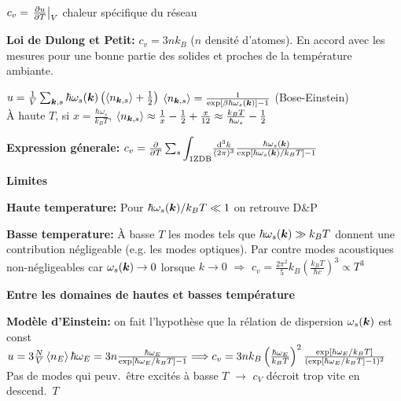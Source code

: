 \begin{squishlist}
    \item $c_v = \left.\D{T}{u}\right|_V$ chaleur spécifique du réseau
    \item \textbf{Loi de Dulong et Petit:} $c_v = 3n k_B$ ($n$ densité d'atomes). En accord avec les mesures pour une bonne partie des solides et proches de la température ambiante.
    \item $u = \frac{1}{V} \sum_{\vk,s} \hbar \omega_s(\vk) \left( \braket{n_{\vk,s}}+\frac{1}{2}\right)$ \quad $\braket{n_{\vk,s}} = \frac{1}{\exp[\beta \hbar \omega_s(\vk)]-1}$ (Bose-Einstein) \\
    À haute $T$, si $x = \frac{\hbar \omega_s}{k_B T}$, \quad $\braket{n_{\vk,s}} \approx \frac{1}{x} - \frac{1}{2} + \frac{x}{12} \approx \frac{k_BT}{\hbar \omega_s} - \frac{1}{2}$
    
    \item \textbf{Expression génerale:} $c_v = \D{T}{} \sum_s {\displaystyle\int_{\text{1ZDB}}} \frac{\ud^3 k}{(2\pi)^3} \frac{\hbar \omega_s(\vk)}{\exp[\hbar \omega_s(\vk)/k_B T]-1}$
    
    \squishline

    \textbf{Limites }
    \item \textbf{Haute temperature:} Pour $\hbar \omega_s(\vk)/k_BT \ll 1$ on retrouve D\&P
    \item \textbf{Basse temperature:} À basse $T$ les modes tels que $\hbar \omega_s(\vk) \gg k_BT$ donnent une contribution négligeable (e.g. les modes optiques). Par contre modes acoustiques non-négligeables car $\omega_s(\vk) \rightarrow 0$ lorsque $k \rightarrow 0$ $\Longrightarrow$ $c_v = \frac{2\pi^2}{5}k_B \left(\frac{k_B T}{\hbar c}\right)^3 \propto T^3$
    
    \squishline

    \textbf{Entre les domaines de hautes et basses température}

    \item \textbf{Modèle d'Einstein:} on fait l'hypothèse que la rélation de dispersion $\omega_s(\vk)$ est const \\
    $u = 3 \frac{N}{V} \braket{n_E}\hbar \omega_E = 3n \frac{\hbar \omega_E}{\exp[\hbar \omega_E/k_BT]-1} \Longrightarrow c_v = 3nk_B \left(\frac{\hbar \omega_E}{k_BT}\right)^2 \frac{\exp[\hbar \omega_E /k_BT]}{(\exp[\hbar \omega_E /k_BT] - 1)^2}$ \\
    Pas de modes qui peuv.\ être excités à basse $T$ $\rightarrow$ $c_V$ décroit trop vite en descend.\ $T$


\end{squishlist}
